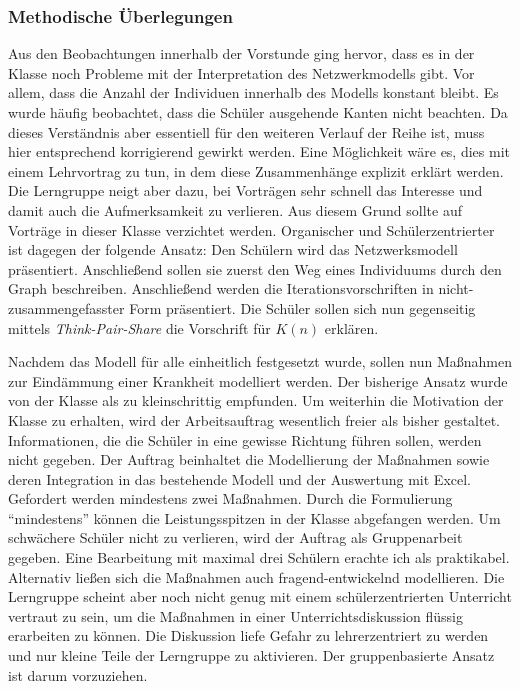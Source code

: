 \subsubsection{Methodische Überlegungen}
Aus den Beobachtungen innerhalb der Vorstunde ging hervor, dass es in der Klasse noch Probleme mit der Interpretation des Netzwerkmodells gibt. Vor allem, dass die Anzahl der Individuen innerhalb des Modells konstant bleibt. Es wurde häufig beobachtet, dass die Schüler ausgehende Kanten nicht beachten. Da dieses Verständnis aber essentiell für den weiteren Verlauf der Reihe ist, muss hier entsprechend korrigierend gewirkt werden. Eine Möglichkeit wäre es, dies mit einem Lehrvortrag zu tun, in dem diese Zusammenhänge explizit erklärt werden. Die Lerngruppe neigt aber dazu, bei Vorträgen sehr schnell das Interesse und damit auch die Aufmerksamkeit zu verlieren. Aus diesem Grund sollte auf Vorträge in dieser Klasse verzichtet werden. Organischer und Schülerzentrierter ist dagegen der folgende Ansatz: Den Schülern wird das Netzwerksmodell präsentiert. Anschließend sollen sie zuerst den Weg eines Individuums durch den Graph beschreiben. Anschließend werden die Iterationsvorschriften in nicht-zusammengefasster Form präsentiert. Die Schüler sollen sich nun gegenseitig mittels \emph{Think-Pair-Share} die Vorschrift für $K(n)$ erklären. 

Nachdem das Modell für alle einheitlich festgesetzt wurde, sollen nun Maßnahmen zur Eindämmung einer Krankheit modelliert werden. Der bisherige Ansatz wurde von der Klasse als zu kleinschrittig empfunden. Um weiterhin die Motivation der Klasse zu erhalten, wird der Arbeitsauftrag wesentlich freier als bisher gestaltet. Informationen, die die Schüler in eine gewisse Richtung führen sollen, werden nicht gegeben. Der Auftrag beinhaltet die Modellierung der Maßnahmen sowie deren Integration in das bestehende Modell und der Auswertung mit Excel. Gefordert werden mindestens zwei Maßnahmen. Durch die Formulierung ``mindestens'' können die Leistungsspitzen in der Klasse abgefangen werden. Um schwächere Schüler nicht zu verlieren, wird der Auftrag als Gruppenarbeit gegeben. Eine Bearbeitung mit maximal drei Schülern erachte ich als praktikabel. Alternativ ließen sich die Maßnahmen auch fragend-entwickelnd modellieren. Die Lerngruppe scheint aber noch nicht genug mit einem schülerzentrierten Unterricht vertraut zu sein, um die Maßnahmen in einer Unterrichtsdiskussion flüssig erarbeiten zu können. Die Diskussion liefe Gefahr zu lehrerzentriert zu werden und nur kleine Teile der Lerngruppe zu aktivieren. Der gruppenbasierte Ansatz ist darum vorzuziehen.

